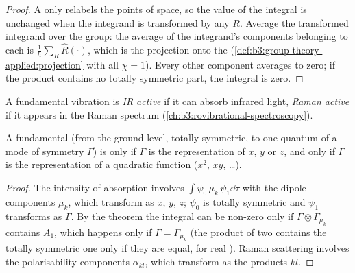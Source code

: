 \begin{proof}
A  only relabels the points of space, so the value of the
integral is unchanged when the integrand is transformed by any $R$. Average
the transformed integrand over the group: the average of the
integrand's components belonging to each  is
$\frac1h\sum_R\hat R(\cdot)$, which is the projection onto the  (\cref{def:b3:group-theory-applied:projection} with all
$\chi = 1$). Every other component averages to zero; if the product contains no
totally symmetric part, the integral is zero.
\end{proof}

\begin{definition}\label{def:b3:group-theory-applied:activity}
A fundamental vibration is \emph{IR active} if it can absorb
infrared light, \emph{Raman active} if it appears in the
Raman spectrum (\cref{ch:b3:rovibrational-spectroscopy}).
\end{definition}

\begin{corollary}\label{cor:b3:group-theory-applied:ir-raman}
A fundamental (from the ground level, totally symmetric, to one quantum
of a mode of symmetry $\Gamma$) is  only if $\Gamma$ is the
representation of $x$, $y$ or $z$, and  only if $\Gamma$ is the
representation of a quadratic function ($x^2$, $xy$, \dots).
\end{corollary}

\begin{proof}
The intensity of absorption involves $\int\psi_0\,\mu_k\,\psi_1\dd\tau$ with the dipole
components $\mu_k$, which transform as $x$, $y$, $z$; $\psi_0$ is totally symmetric
and $\psi_1$ transforms as $\Gamma$. By the theorem the integral can be non-zero
only if $\Gamma\otimes\Gamma_{\mu_k}$ contains $A_1$, which happens only if $\Gamma =
\Gamma_{\mu_k}$ (the product of two  contains the
totally symmetric one only if they are equal, for real ). Raman
scattering involves the polarisability components $\alpha_{kl}$, which
transform as the products $kl$.
\end{proof}

